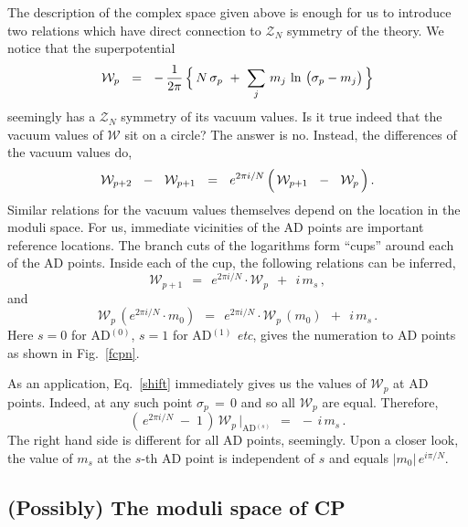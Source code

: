 \documentclass[epsfig,12pt]{article}
\def\beq{\begin{equation}}
\def\eeq{\end{equation}}
\def\beq{\begin{equation}}
\def\eeq{\end{equation}}
\newcommand{\mc}[1]{\mathcal{#1}}
\newcommand{\W}{\mathcal{W}}
\begin{document}
	The description of the complex space given above is enough for us to introduce two relations which have
	direct connection to $ \mc{Z}_N $ symmetry of the theory.
	We notice that the superpotential
\beq
	\W_p ~~=~~ 
		-\, \frac{1}{2\pi}\,  
                \Bigl\{\, N\, \sigma_p ~+~ \sum_j\, m_j\, \ln\, \big( \sigma_p - m_j \big) \,\Bigr\}
\eeq
	seemingly has a $ \mc{Z}_N $ symmetry of its vacuum values. 
	Is it true indeed that the vacuum values of $ \W $ sit on a circle?
	The answer is no. 
	Instead, the differences of the vacuum values do,
\beq
	\W_{p+2}  ~~-~~  \W_{p+1}  ~~=~~ 
        e^{2 \pi i / N}\, \Bigl(\,  \W_{p+1}  ~~-~~ \W_{p}   \,\Bigr) \,.
\eeq
	Similar relations for the vacuum values themselves depend on the location in the moduli space.
	For us, immediate vicinities of the AD points are important reference locations.
	The branch cuts of the logarithms form ``cups'' around each of the AD points.
	Inside each of the cup, the following relations can be inferred,
\beq
\label{shift}
	\W_{p+1} ~~=~~ e^{2 \pi i / N} \cdot \W_p ~~+~~ i\, m_s\,,
\eeq
	and
\beq
\label{shiftm}
	\W_p\, (e^{2 \pi i / N} \cdot m_0) ~~=~~ e^{2 \pi i / N} \cdot \W_p\, (m_0) ~~+~~ i\, m_s\,.
\eeq
	Here $ s = 0 $ for AD$^{(0)}$, $ s = 1 $ for AD$^{(1)}$ {\it etc}, gives the numeration
	to AD points as shown in Fig.~\ref{fcpn}.

	As an application, Eq.~\eqref{shift} immediately gives us the values of $ \W_p $ at AD points.
	Indeed, at any such point $ \sigma_p \,=\, 0 $ and so all $ \W_p $ are equal.
	Therefore,
\beq
	\left(\, e^{2 \pi i / N} \;-\; 1 \,\right)\, \W_p\, \biggr|_\text{AD$^{(s)}$} ~~=~~ -\, i\, m_s\,.
\eeq
	The right hand side is different for all AD points, seemingly. 
	Upon a closer look, the value of $ m_s $ at the $ s $-th AD point is independent of $ s $ and equals
	$ |m_0|\,e^{i \pi / N} $.



\newpage
\subsection{(Possibly) The moduli space of CP}

\end{document}

